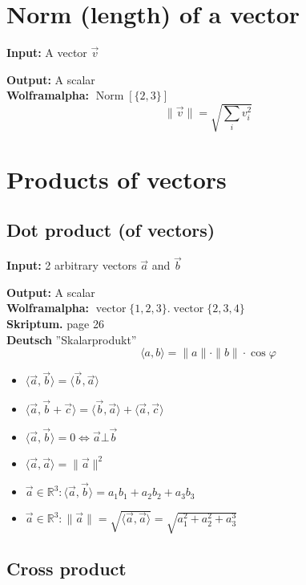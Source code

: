 \documentclass[a4paper,twocolumn]{article}
\newcommand{\io}[2]{{\par\noindent\textbf{Input:} #1 \\}{\textbf{Output:} #2 \\}}
\newcommand{\wa}[1]{\textbf{Wolframalpha:} $#1$ \\}
\newcommand{\scriptref}[1]{\textbf{Skriptum.} page #1 \\}
\newcommand{\dt}[1]{\textbf{Deutsch } #1 \\}
\begin{document}
\section{Norm (length) of a vector}
%
\io{A vector $\vec{v}$}{A scalar}
\wa{\operatorname{Norm}[\{2,3\}]}
%
\[
    \|\vec{v}\| = \sqrt{\sum_i v_i^2}
\]

\section{Products of vectors}

\subsection{Dot product (of vectors)}

\io{2 arbitrary vectors $\vec{a}$ and $\vec{b}$}{A scalar}
\wa{\operatorname{vector}\{1,2,3\} . \operatorname{vector}\{2,3,4\}}
\scriptref{26}
\dt{''Skalarprodukt''}
%
\[
    \langle a, b\rangle = \|a\|\cdot\|b\| \cdot \cos{\varphi}
\]
%
\begin{itemize}
  \item $\langle \vec{a}, \vec{b}\rangle = \langle \vec{b}, \vec{a}\rangle$
  \item $\langle \vec{a}, \vec{b}+\vec{c}\rangle = \langle \vec{b},
        \vec{a}\rangle + \langle \vec{a},\vec{c}\rangle$
  \item $\langle \vec{a}, \vec{b}\rangle = 0 \Leftrightarrow
        \vec{a}\bot \vec{b}$
  \item $\langle \vec{a}, \vec{a}\rangle = \|\vec{a}\|^2$
  \item $\vec{a} \in \mathbb{R}^3:
        \langle \vec{a},\vec{b} \rangle = a_1b_1 + a_2b_2 + a_3b_3$
  \item $\vec{a} \in \mathbb{R}^3:
        \|\vec{a}\| = \sqrt{\langle \vec{a}, \vec{a}\rangle}
        = \sqrt{a_1^2 + a_2^2 + a_3^3}$
\end{itemize}

\subsection{Cross product}
\end{document}
